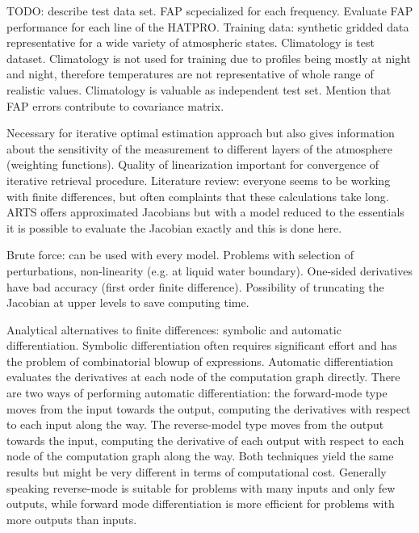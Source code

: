         TODO: describe test data set. FAP scpecialized for each frequency.
        Evaluate FAP performance for each line of the HATPRO. Training data:
        synthetic gridded data representative for a wide variety of atmospheric
        states. Climatology is test dataset. Climatology is not used for training
        due to profiles being mostly at night and night, therefore temperatures are
        not representative of whole range of realistic values. Climatology is
        valuable as independent test set. Mention that FAP errors contribute to
        covariance matrix.

    \stopsubsection

    \startsubsection[title=Linearization,reference=ch:linearization]

        Necessary for iterative optimal estimation approach but also gives
        information about the sensitivity of the measurement to different layers of
        the atmosphere (weighting functions). Quality of linearization important
        for convergence of iterative retrieval procedure. Literature review:
        everyone seems to be working with finite differences, but often complaints
        that these calculations take long. ARTS offers approximated Jacobians
        but with a model reduced to the essentials it is possible to evaluate the
        Jacobian exactly and this is done here.

        Brute force: can be used with every model. Problems with selection of
        perturbations, non-linearity (e.g. at liquid water boundary). One-sided
        derivatives have bad accuracy (first order finite difference).
        Possibility of truncating the Jacobian at upper levels to save
        computing time.

        Analytical alternatives to finite differences: symbolic and automatic
        differentiation. Symbolic differentiation often requires significant
        effort and has the problem of combinatorial blowup of expressions.
        Automatic differentiation evaluates the derivatives at each node of
        the computation graph directly. There are two ways of performing
        automatic differentiation: the forward-mode type moves from the input
        towards the output, computing the derivatives with respect to each
        input along the way. The reverse-model type moves from the output
        towards the input, computing the derivative of each output with respect
        to each node of the computation graph along the way. Both techniques
        yield the same results but might be very different in terms of
        computational cost. Generally speaking reverse-mode is suitable for
        problems with many inputs and only few outputs, while forward mode
        differentiation is more efficient for problems with more outputs than
        inputs.

